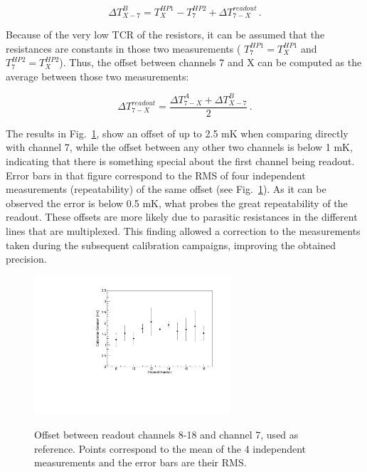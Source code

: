     \begin{equation}
        \Delta T_{X-7}^B = T_{X}^{HP1}-T_{7}^{HP2}+\Delta T_{7-X}^{readout} \, .
    \end{equation}  

\noindent 
Because of the very low TCR of the resistors, it can be assumed that the resistances are constants in those two measurements ( $T_{7}^{HP1}=T_{X}^{HP1}$ and $T_{7}^{HP2}=T_{X}^{HP2}$). Thus, the offset between channels 7 and X can be computed as the average between those two measurements: 

\begin{equation}
    \Delta T_{7-X}^{readout} = \frac{\Delta T^{A}_{7-X} + \Delta T^{B}_{X-7}}{2} \, .
\end{equation}

The results in Fig.~\ref{fig:readout_calib}, show an offset of up to 2.5 mK when comparing directly with channel 7, while the offset between any other two channels is below 1 mK, indicating that there is something special about the first channel being readout. Error bars in that figure correspond to the RMS of four independent measurements (repeatability) of the same offset (see Fig.~\ref{fig:readout_calib}). As it can be observed the error is below 0.5 mK, what probes the great repeatability of the readout. These offsets are more likely due to parasitic resistances in the different lines that are multiplexed. This finding allowed a correction to the measurements taken during the subsequent calibration campaigns, improving the obtained precision. 

\begin{figure}[htbp]
\centering
{\includegraphics[width=0.65\textwidth]{images/figure_3.pdf}}
\caption{Offset between readout channels 8-18 and channel 7, used as reference. Points correspond to the mean of the 4 independent measurements and the error bars are their RMS.}
\label{fig:readout_calib}
\end{figure}